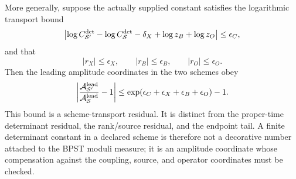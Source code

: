 \begin{controlledapproximation}
More generally, suppose the actually supplied constant satisfies the
logarithmic transport bound
\begin{equation}
  \left|
  \log C_{\mathcal S'}^{\rm det}
  -
  \log C_{\mathcal S}^{\rm det}
  -
  \delta_X+\log z_B+\log z_O
  \right|
  \le\epsilon_C,
  \label{eq:instanton-determinant-scheme-log-bound}
\end{equation}
and that
\[
  |r_X|\le\epsilon_X,\qquad |r_B|\le\epsilon_B,\qquad
  |r_O|\le\epsilon_O .
\]
Then the leading amplitude coordinates in the two schemes obey
\begin{equation}
  \left|
  \frac{\mathcal A_{\mathcal S'}^{\rm lead}}
       {\mathcal A_{\mathcal S}^{\rm lead}}
  -1
  \right|
  \le
  \exp(\epsilon_C+\epsilon_X+\epsilon_B+\epsilon_O)-1 .
  \label{eq:instanton-determinant-scheme-amplitude-bound}
\end{equation}
This bound is a scheme-transport residual.  It is distinct from the
proper-time determinant residual, the rank/source residual, and the endpoint
tail.  A finite determinant constant in a declared scheme is therefore not a
decorative number attached to the BPST moduli measure; it is an amplitude
coordinate whose compensation against the coupling, source, and operator
coordinates must be checked.
\end{controlledapproximation}

